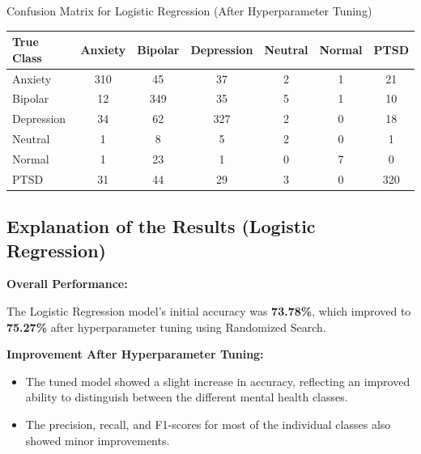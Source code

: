 \begin{center}
Confusion Matrix for Logistic Regression (After Hyperparameter Tuning) \\
\begin{tabular}{|l|c|c|c|c|c|c|}
\hline
\textbf{True Class} & \textbf{Anxiety} & \textbf{Bipolar} & \textbf{Depression} & \textbf{Neutral} & \textbf{Normal} & \textbf{PTSD} \\ \hline
Anxiety             & 310              & 45               & 37                  & 2                & 1               & 21            \\ \hline
Bipolar             & 12               & 349              & 35                  & 5                & 1               & 10            \\ \hline
Depression          & 34               & 62               & 327                 & 2                & 0               & 18            \\ \hline
Neutral             & 1                & 8                & 5                   & 2                & 0               & 1             \\ \hline
Normal              & 1                & 23               & 1                   & 0                & 7               & 0             \\ \hline
PTSD                & 31               & 44               & 29                  & 3                & 0               & 320           \\ \hline
\end{tabular}
\end{center}

\subsection{Explanation of the Results (Logistic Regression)}

\textbf{Overall Performance:}

The Logistic Regression model's initial accuracy was \textbf{73.78\%}, which improved to \textbf{75.27\%} after hyperparameter tuning using Randomized Search.

\textbf{Improvement After Hyperparameter Tuning:}

\begin{itemize}
    \item The tuned model showed a slight increase in accuracy, reflecting an improved ability to distinguish between the different mental health classes.
    \item The precision, recall, and F1-scores for most of the individual classes also showed minor improvements.
\end{itemize}

